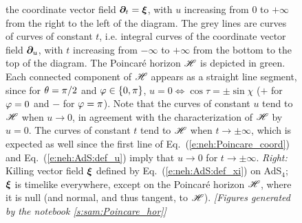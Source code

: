 \begin{figure}
{the coordinate vector field $\bm{\partial}_t = \bm{\xi}$, with $u$ increasing from $0$ to $+\infty$
from the right to the left of the diagram. The grey lines are
curves of curves
of constant $t$, i.e. integral curves of the coordinate vector field $\bm{\partial}_u$,
with $t$ increasing from $-\infty$ to $+\infty$ from the bottom to the top
of the diagram. The Poincaré horizon $\mathscr{H}$ is depicted in green.
Each connected component of $\mathscr{H}$ appears as a straight line segment, since for $\theta=\pi/2$
and $\varphi\in\{0,\pi\}$, $u = 0 \iff \cos\tau = \pm \sin\chi$ ($+$ for $\varphi=0$ and $-$ for $\varphi=\pi$).
Note that the curves of constant $u$ tend to $\mathscr{H}$ when $u\to 0$, in agreement
with the characterization of $\mathscr{H}$ by $u=0$. The curves of constant
$t$ tend to $\mathscr{H}$ when $t\to \pm\infty$, which is expected as well since
the first line of Eq.~(\ref{e:neh:Poincare_coord}) and Eq.~(\ref{e:neh:AdS:def_u})
imply that $u\to 0$ for $t\to \pm\infty$.
\emph{Right:} Killing vector field $\bm{\xi}$ defined by Eq.~(\ref{e:neh:AdS:def_xi})
on AdS$_{4}$; $\bm{\xi}$ is timelike everywhere, except on the Poincaré
horizon $\mathscr{H}$, where it is null (and normal, and thus tangent, to $\mathscr{H}$).
\textsl{[Figures generated by the notebook \ref{s:sam:Poincare_hor}]}
}
\end{figure}

